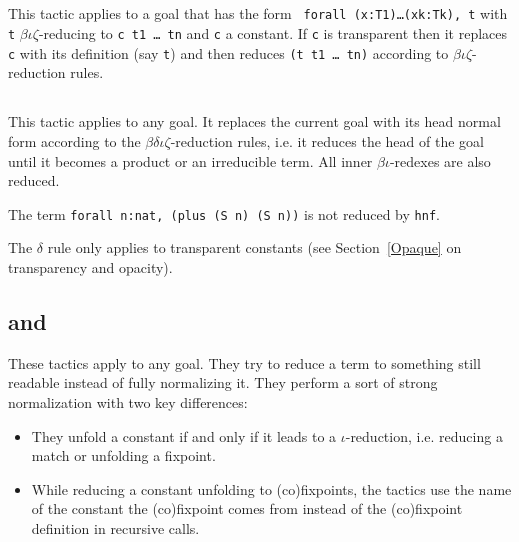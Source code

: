 %


\subsection{}

This tactic applies to a goal that has the form {\tt
  forall (x:T1)\dots(xk:Tk), t} with {\tt t}
$\beta\iota\zeta$-reducing to {\tt c t1 \dots\ tn} and {\tt c} a
constant.  If
{\tt c} is transparent then it replaces {\tt c} with its definition
(say {\tt t}) and then reduces {\tt (t t1 \dots\ tn)} according to
$\beta\iota\zeta$-reduction rules.

\begin{ErrMsgs}
\item {}
\end{ErrMsgs}

\subsection{}

This tactic applies to any goal. It replaces the current goal with its
head normal form according to the $\beta\delta\iota\zeta$-reduction
rules, i.e.  it reduces the head of the goal until it becomes a
product or an irreducible term. All inner $\beta\iota$-redexes are also
reduced.

\Example
The term \verb+forall n:nat, (plus (S n) (S n))+ is not reduced by {\tt hnf}.

\Rem The $\delta$ rule only applies to transparent constants
(see Section~\ref{Opaque} on transparency and opacity).

\subsection{\texorpdfstring{{}}{cbn} and \texorpdfstring{{}}{simpl}}
 

These tactics apply to any goal. They try to reduce a term to
something still readable instead of fully normalizing it. They perform
a sort of strong normalization with two key differences:
\begin{itemize}
\item They unfold a constant if and only if it leads to a
  $\iota$-reduction, i.e. reducing a match or unfolding a fixpoint.
\item While reducing a constant unfolding to (co)fixpoints, 
  the tactics use the name of the
  constant the (co)fixpoint comes from instead of the (co)fixpoint
  definition in recursive calls.
\end{itemize}

